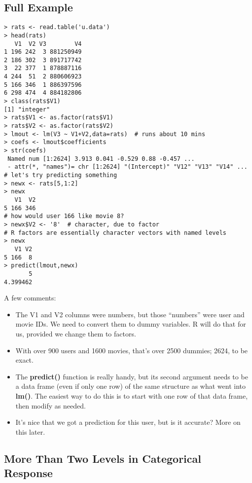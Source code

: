 \subsection{Full Example}
\label{lmex}

\begin{lstlisting}
> rats <- read.table('u.data')
> head(rats)
   V1  V2 V3        V4
1 196 242  3 881250949
2 186 302  3 891717742
3  22 377  1 878887116
4 244  51  2 880606923
5 166 346  1 886397596
6 298 474  4 884182806
> class(rats$V1)
[1] "integer"
> rats$V1 <- as.factor(rats$V1)
> rats$V2 <- as.factor(rats$V2)
> lmout <- lm(V3 ~ V1+V2,data=rats)  # runs about 10 mins
> coefs <- lmout$coefficients
> str(coefs)
 Named num [1:2624] 3.913 0.041 -0.529 0.88 -0.457 ...
 - attr(*, "names")= chr [1:2624] "(Intercept)" "V12" "V13" "V14" ...
# let's try predicting something
> newx <- rats[5,1:2]
> newx
   V1  V2
5 166 346
# how would user 166 like movie 8?
> newx$V2 <- '8'  # character, due to factor
# R factors are essentially character vectors with named levels
> newx
   V1 V2
5 166  8
> predict(lmout,newx)
       5 
4.399462 
\end{lstlisting}

A few comments:

\begin{itemize}

\item The V1 and V2 columns were numbers, but those ``numbers'' were
user and movie IDs.  We need to convert them to dummy variables.  R will
do that for us, provided we change them to factors.

\item With over 900 users and 1600 movies, that's over 2500 dummies;
2624, to be exact.

\item The \textbf{predict()} function is really handy, but its second
argument needs to be a data frame (even if only one row) of the same
structure as what went into \textbf{lm()}.  The easiest way to do this
is to start with one row of that data frame, then modify as needed.

\item It's nice that we got a prediction for this user, but is it
accurate?  More on this later.
\end{itemize} 


\subsection{More Than Two Levels in Categorical Response}

